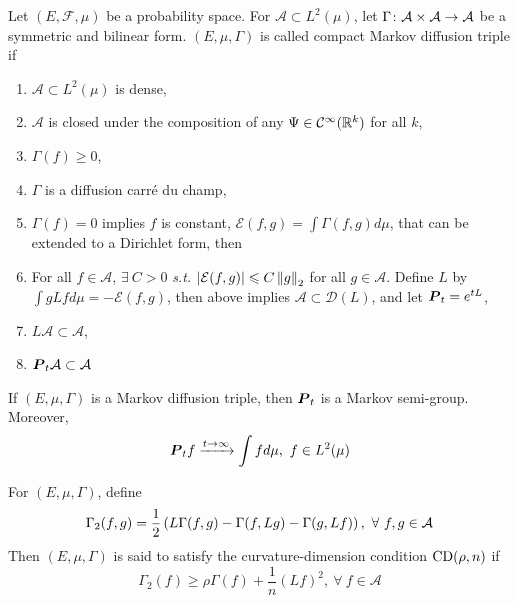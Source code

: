 \documentclass[a4paper,12pt]{article}
\begin{document}
\begin{itemize}
  \noindent Let $(E,\mathcal{F},\mu)$ be a probability space. For $\mathcal{A} \subset L^2(\mu)$, let $\Gamma \colon \mathcal{A} \times \mathcal{A} \rightarrow \mathcal{A}$ be a symmetric and bilinear form. $(E,\mu,\Gamma)$ is called compact Markov diffusion triple if 
  \begin{enumerate}[label=(\roman*)]
    \item $\mathcal{A} \subset L^2(\mu)$ is dense,
    \item $\mathcal{A}$ is closed under the composition of any $\Psi \in \mathcal{C}^\infty(\mathbb{R}^k)$ for all $k$,
    \item $\Gamma(f) \geqslant 0$,
    \item $\Gamma$ is a diffusion carr\'e du champ,
    \item $\Gamma(f) = 0$ implies $f$ is constant,
    \vspace{0.5em}
    $\mathcal{E}(f,g) = \int \Gamma(f,g)d\mu$, that can be extended to a Dirichlet form, then
    \item For all $f \in \mathcal{A}$, $\exists~C > 0$ \emph{s.t.} $\left\lvert\mathcal{E}(f,g)\right\lvert \leqslant C\left\lVert g\right\lVert_2$ for all $g \in \mathcal{A}$.
    \vspace{0.5em}
    Define $L$ by $\int gLfd\mu = - \mathcal{E}(f,g)$, then above implies $\mathcal{A} \subset \mathcal{D}(L)$, and let $\boldsymbol{P}_t = e^{tL}$,
    \item $L\mathcal{A} \subset \mathcal{A}$,
    \item $\boldsymbol{P}_t\mathcal{A} \subset \mathcal{A}$
  \end{enumerate}
  If $(E,\mu,\Gamma)$ is a Markov diffusion triple, then $\boldsymbol{P}_t$ is a Markov semi-group. Moreover,
  \begin{equation*}
    \boldsymbol{P}_tf \xrightarrow{t\rightarrow \infty} \int f d \mu,~f\in L^2(\mu)
  \end{equation*}

  \noindent For $(E,\mu,\Gamma)$, define
  \begin{equation*}
    \Gamma_2(f,g) = \frac{1}{2}\left(L\Gamma(f,g)-\Gamma(f,Lg)-\Gamma(g,Lf)\right),~\forall~f,g \in \mathcal{A}
  \end{equation*}
  Then $(E,\mu,\Gamma)$ is said to satisfy the curvature-dimension condition $\operatorname{CD}(\rho,n)$ if
  \begin{equation*}
    \Gamma_2(f) \geqslant \rho\Gamma(f) + \frac{1}{n}(Lf)^2,~\forall~f \in \mathcal{A}
  \end{equation*}


\end{itemize}
\end{document}
